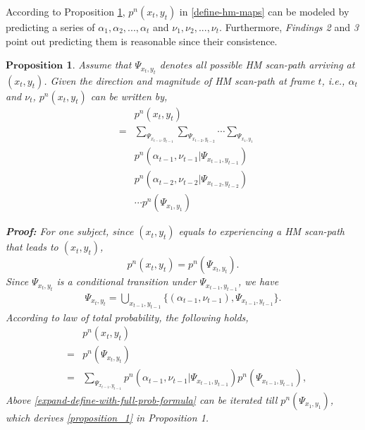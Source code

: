 \documentclass[10pt,journal,compsoc]{IEEEtran}
\newtheorem{proposition}[theorem]{$\textbf{Proposition}$}
\begin{document}
According to Proposition \ref{lemma1}, $p^n(x_t, y_t)$ in \eqref{define-hm-maps} can be modeled by predicting a series of $\alpha_1,\alpha_2,...,\alpha_t$ and $\nu_1,\nu_2,...,\nu_t$. Furthermore, \textit{Findings 2} and \textit{3} point out predicting them is reasonable since their consistence.
\begin{proposition}
    \label{lemma1}
    Assume that $\Psi_{ x_{t}, y_{t} }$ denotes all possible HM scan-path arriving at $(x_{t}, y_{t})$. Given the direction and magnitude of HM scan-path at frame $t$, i.e., $\alpha_t$ and $\nu_t$, $p^n(x_t, y_t)$ can be written by,
    \begin{eqnarray}
            \label{proposition_1}
            && p^n(x_t, y_t) \nonumber\\
            \nonumber &=& \sum_{ \Psi_{ x_{t-1}, y_{t-1} } } \sum_{ \Psi_{ x_{t-2}, y_{t-2} } } \cdots \sum_{ \Psi_{ x_{1}, y_{1} } }
            \\ \nonumber && p^n( \alpha_{t-1}, \nu_{t-1} | \Psi_{ x_{t-1}, y_{t-1} } )
            \\ \nonumber && p^n( \alpha_{t-2}, \nu_{t-2} | \Psi_{ x_{t-2}, y_{t-2} } )
            \\ && \cdots p^n( \Psi_{ x_{1}, y_{1} } )
        \end{eqnarray}

    \textbf{Proof:}
        For one subject, since $(x_t,y_t)$ equals to experiencing a HM scan-path that leads to $(x_t,y_t)$,
        \begin{equation}
            \label{define}
            p^n(x_t, y_t) = p^n( \Psi_{ x_t, y_t } ).
        \end{equation}
        Since $\Psi_{ x_t, y_t }$ is a conditional transition under $\Psi_{ x_{t-1}, y_{t-1} }$, we have
        \begin{eqnarray}
            \label{expand-path}
             \Psi_{ x_t, y_t } = \bigcup_{x_{t-1}, y_{t-1}} \{ (\alpha_{t-1}, \nu_{t-1}),\Psi_{ x_{t-1}, y_{t-1} } \}.
        \end{eqnarray}
        According to law of total probability, the following holds,
        \begin{eqnarray}
            \label{expand-define-with-full-prob-formula}
            && p^n(x_t, y_t) \nonumber\\
            &=& p^n( \Psi_{ x_t, y_t } ) \nonumber\\
            &=& \sum_{ \Psi_{ x_{t-1}, y_{t-1} } } \!\!\!p^n( \alpha_{t-1}, \nu_{t-1} | \Psi_{ x_{t-1}, y_{t-1} } ) p^n( \Psi_{ x_{t-1}, y_{t-1} } ),
        \end{eqnarray}
        Above \eqref{expand-define-with-full-prob-formula} can be iterated till $p^n( \Psi_{ x_{1}, y_{1} } )$, which derives \eqref{proposition_1} in Proposition 1.

\end{proposition}
\end{document}
